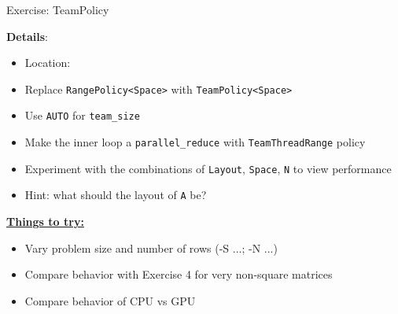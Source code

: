 \begin{frame}[fragile]{Exercise: TeamPolicy}

  \textbf{Details}:
  \begin{small}
  \begin{itemize}
\item Location: 
\item Replace \texttt{RangePolicy<Space>} with \texttt{TeamPolicy<Space>}
\item Use \texttt{AUTO} for \texttt{team\_size}
\item Make the inner loop a \texttt{parallel\_reduce} with \texttt{TeamThreadRange} policy
\item Experiment with the combinations of \texttt{Layout}, \texttt{Space}, \texttt{N} to view performance
\item Hint: what should the layout of \texttt{A} be?
\end{itemize}
  \end{small}

\ul{\textbf{Things to try:}}
  \begin{small}
  \begin{itemize}
  \item Vary problem size and number of rows (-S ...; -N ...)
  \item Compare behavior with Exercise 4 for very non-square matrices
  \item Compare behavior of CPU vs GPU
  \end{itemize}
  \end{small}

\end{frame}


